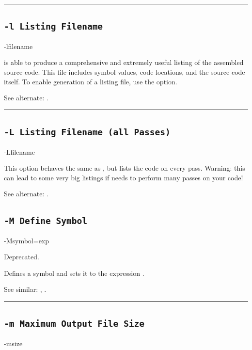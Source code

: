 \hrule

\subsection{\texttt{-l Listing Filename}}
\label{flag:listing}

\begin{usage}
-lfilename
\end{usage}

\dasm is able to produce a comprehensive and extremely useful listing of the assembled source code. This file includes symbol values, code locations, and the source code itself. To enable generation of a listing file, use the  option.

See alternate: .\\

\hrule
\subsection{\texttt{-L Listing Filename (all Passes)}}
\label{flag:listingall}

\begin{usage}
-Lfilename
\end{usage}

This option behaves the same as , but lists the code on every pass. Warning: this can lead to some very big listings if \dasm needs to perform many passes on your code!

See alternate: .

\subsection{\texttt{-M Define Symbol}}
\label{flag:definesymbolM}
\begin{usage}
-Msymbol=exp
\end{usage}

Deprecated.

Defines a symbol and sets it to the expression .

See similar: , .\\

\hrule

\subsection{\texttt{-m Maximum Output File Size}}
\label{flag:maximum}
\begin{usage}
-msize
\end{usage}

